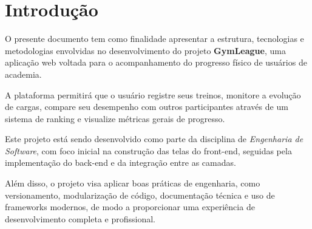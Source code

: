 \chapter{Introdução}

O presente documento tem como finalidade apresentar a estrutura, tecnologias e metodologias envolvidas no desenvolvimento do projeto \textbf{GymLeague}, uma aplicação web voltada para o acompanhamento do progresso físico de usuários de academia. 

A plataforma permitirá que o usuário registre seus treinos, monitore a evolução de cargas, compare seu desempenho com outros participantes através de um sistema de ranking e visualize métricas gerais de progresso. 

Este projeto está sendo desenvolvido como parte da disciplina de \textit{Engenharia de Software}, com foco inicial na construção das telas do front-end, seguidas pela implementação do back-end e da integração entre as camadas.

Além disso, o projeto visa aplicar boas práticas de engenharia, como versionamento, modularização de código, documentação técnica e uso de frameworks modernos, de modo a proporcionar uma experiência de desenvolvimento completa e profissional.